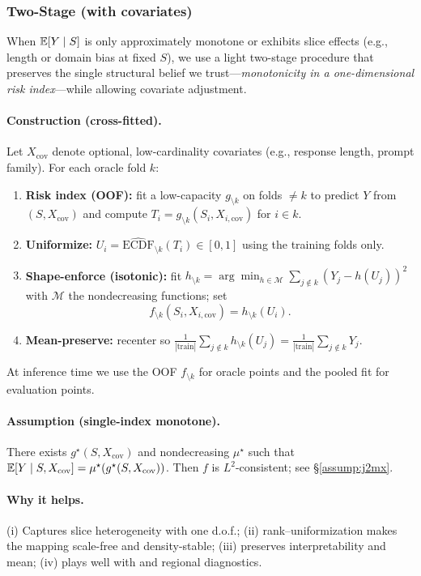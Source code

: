 \subsubsection{Two-Stage \autocal{} (with covariates)}
\label{sec:two-stage-autocal}

When $\operatorname{\mathbb{E}}[Y\mid S]$ is only approximately monotone or exhibits slice effects (e.g., length or domain bias at fixed $S$), we use a light two-stage procedure that preserves the single structural belief we trust---\emph{monotonicity in a one-dimensional risk index}---while allowing covariate adjustment.

\paragraph{Construction (cross-fitted).} Let $X_{\mathrm{cov}}$ denote optional, low-cardinality covariates (e.g., response length, prompt family). For each oracle fold $k$:
\begin{enumerate}
\item \textbf{Risk index (OOF):} fit a low-capacity $g_{\setminus k}$ on folds $\neq k$ to predict $Y$ from $(S, X_{\mathrm{cov}})$ and compute $T_i = g_{\setminus k}(S_i, X_{i,\mathrm{cov}})$ for $i \in k$.
\item \textbf{Uniformize:} $U_i = \widehat{\mathrm{ECDF}}_{\setminus k}(T_i) \in [0,1]$ using the training folds only.
\item \textbf{Shape-enforce (isotonic):} fit $h_{\setminus k} = \arg\min_{h \in \mathcal{M}} \sum_{j \notin k} (Y_j - h(U_j))^2$ with $\mathcal{M}$ the nondecreasing functions; set
\[
f_{\setminus k}(S_i, X_{i,\mathrm{cov}})=h_{\setminus k}(U_i).
\]
\item \textbf{Mean-preserve:} recenter so $\frac{1}{|{\text{train}}|}\sum_{j\notin k} h_{\setminus k}(U_j)=\frac{1}{|{\text{train}}|}\sum_{j\notin k} Y_j$.
\end{enumerate}
At inference time we use the OOF $f_{\setminus k}$ for oracle points and the pooled fit for evaluation points.

\paragraph{Assumption (single-index monotone).} There exists $g^\star(S,X_{\mathrm{cov}})$ and nondecreasing $\mu^\star$ such that $\operatorname{\mathbb{E}}[Y\mid S,X_{\mathrm{cov}}]=\mu^\star(g^\star(S,X_{\mathrm{cov}}))$. Then $f$ is $L^2$-consistent; see \S\ref{assump:j2mx}.

\paragraph{Why it helps.} (i) Captures slice heterogeneity with one d.o.f.; (ii) rank--uniformization makes the mapping scale-free and density-stable; (iii) preserves interpretability and mean; (iv) plays well with \oua{} and regional diagnostics.

